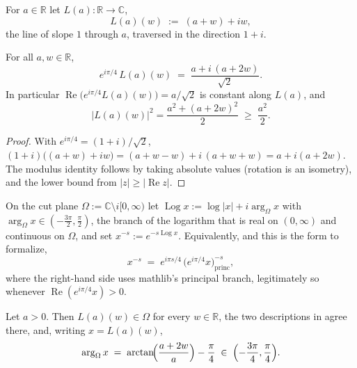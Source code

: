 \begin{definition}
\label{def:rs_line}
\leanok
For $a\in\mathbb{R}$ let $L(a):\mathbb{R}\to\mathbb{C}$,
\[
  L(a)(w)\;:=\;(a+w)+iw ,
\]
the line of slope $1$ through $a$, traversed in the direction $1+i$.
\end{definition}

\begin{lemma}
\label{lem:rs_rotate}
\leanok
{}
For all $a,w\in\mathbb{R}$,
\[
  e^{i\pi/4}\,L(a)(w)\;=\;\frac{a+i\,(a+2w)}{\sqrt2}.
\]
In particular $\operatorname{Re}\bigl(e^{i\pi/4}L(a)(w)\bigr)=a/\sqrt2$ is constant along
$L(a)$, and
\[
  \bigl|L(a)(w)\bigr|^{2}=\frac{a^{2}+(a+2w)^{2}}{2}\;\ge\;\frac{a^{2}}2 .
\]
\end{lemma}

\begin{proof}
\leanok
With $e^{i\pi/4}=(1+i)/\sqrt2$,
$(1+i)\bigl((a+w)+iw\bigr)=(a+w-w)+i\,(a+w+w)=a+i(a+2w)$.  The modulus identity follows
by taking absolute values (rotation is an isometry), and the lower bound from
$|z|\ge|\operatorname{Re}z|$.
\end{proof}

\begin{definition}
\label{def:rs_power}
\leanok
On the cut plane $\Omega:=\mathbb{C}\setminus i[0,\infty)$ let
$\operatorname{Log}x:=\log\lvert x\rvert+i\arg_{\Omega}x$ with
$\arg_{\Omega}x\in(-\tfrac{3\pi}2,\tfrac\pi2)$, the branch of the logarithm that is real
on $(0,\infty)$ and continuous on $\Omega$, and set $x^{-s}:=e^{-s\operatorname{Log}x}$.
Equivalently, and this is the form to formalize,
\[
  x^{-s}\;=\;e^{i\pi s/4}\,\bigl(e^{i\pi/4}x\bigr)^{-s}_{\mathrm{princ}},
\]
where the right-hand side uses mathlib's principal branch, legitimately so whenever
$\operatorname{Re}(e^{i\pi/4}x)>0$.
\end{definition}

\begin{lemma}
\label{lem:rs_branch_ok}
\leanok
{}
Let $a>0$.  Then $L(a)(w)\in\Omega$ for every $w\in\mathbb{R}$, the two descriptions in
 agree there, and, writing $x=L(a)(w)$,
\[
  \arg_{\Omega}x\;=\;\arctan\!\Bigl(\frac{a+2w}{a}\Bigr)-\frac\pi4\;\in\;\Bigl(-\frac{3\pi}4,\frac\pi4\Bigr).
\]
\end{lemma}

